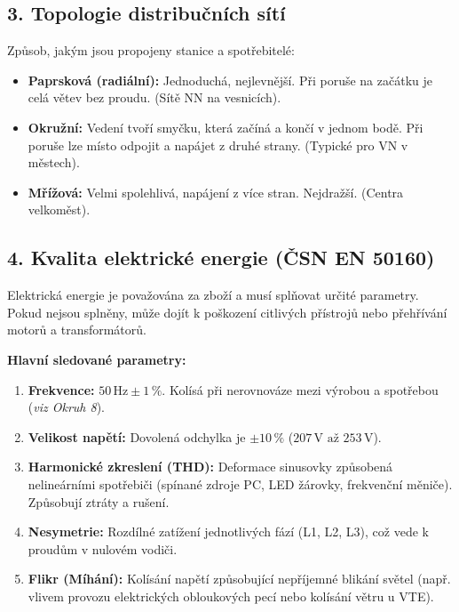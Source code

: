 \documentclass[a4paper,10pt]{article}
\begin{document}
\begin{vysvetlenibox}
\begin{center}
\end{center}

\subsection*{3. Topologie distribučních sítí}

Způsob, jakým jsou propojeny stanice a spotřebitelé:
\begin{itemize}
    \item \textbf{Paprsková (radiální):} Jednoduchá, nejlevnější. Při poruše na začátku je celá větev bez proudu. (Sítě NN na vesnicích).
    \item \textbf{Okružní:} Vedení tvoří smyčku, která začíná a končí v jednom bodě. Při poruše lze místo odpojit a napájet z druhé strany. (Typické pro VN v městech).
    \item \textbf{Mřížová:} Velmi spolehlivá, napájení z více stran. Nejdražší. (Centra velkoměst).
\end{itemize}

\subsection*{4. Kvalita elektrické energie (ČSN EN 50160)}

Elektrická energie je považována za zboží a musí splňovat určité parametry. Pokud nejsou splněny, může dojít k poškození citlivých přístrojů nebo přehřívání motorů a transformátorů.

\textbf{Hlavní sledované parametry:}
\begin{enumerate}
    \item \textbf{Frekvence:} $50\,\mathrm{Hz} \pm 1\,\%$. Kolísá při nerovnováze mezi výrobou a spotřebou (\textit{viz Okruh 8}).
    \item \textbf{Velikost napětí:} Dovolená odchylka je $\pm 10\,\%$ ($207\,\mathrm{V} \text{ až } 253\,\mathrm{V}$).
    \item \textbf{Harmonické zkreslení (THD):} Deformace sinusovky způsobená nelineárními spotřebiči (spínané zdroje PC, LED žárovky, frekvenční měniče). Způsobují ztráty a rušení.
    \item \textbf{Nesymetrie:} Rozdílné zatížení jednotlivých fází (L1, L2, L3), což vede k proudům v nulovém vodiči.
    \item \textbf{Flikr (Míhání):} Kolísání napětí způsobující nepříjemné blikání světel (např. vlivem provozu elektrických obloukových pecí nebo kolísání větru u VTE).
\end{enumerate}


\end{vysvetlenibox}
\end{document}
